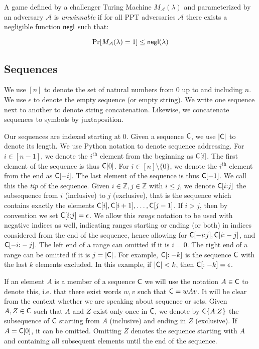 \begin{definition}[Unwinnability]
  A game defined by a challenger Turing Machine $M_\mathcal{A}(\lambda)$ and parameterized by an adversary $\mathcal{A}$ is \emph{unwinnable} if for all PPT adversaries $\mathcal{A}$ there exists a negligible function $\mathsf{negl}$ such that:

  \[
    \Pr[M_\mathcal{A}(\lambda) = 1] \leq \mathsf{negl}(\lambda)
  \]
\end{definition}

\subsection{Sequences}
We use $[n]$ to denote the set of natural numbers from $0$ up to and including
$n$. We use $\epsilon$ to denote the empty sequence (or empty string). We write
one sequence next to another to denote string concatenation. Likewise, we
concatenate sequences to symbols by juxtaposition.

Our sequences are indexed starting at $0$. Given a sequence $\mathsf{C}$, we use
$|\mathsf{C}|$ to denote its length. We use Python notation to denote sequence
addressing. For $i \in [n - 1]$, we denote the $i^\text{th}$ element from the
beginning as $\mathsf{C}[i]$. The first element of the sequence is thus $\mathsf{C}[0]$.
For $i \in [n] \setminus \{0\}$, we denote the $i^\text{th}$ element from the
end as $\mathsf{C}[-i]$. The last element of the sequence is thus $\mathsf{C}[-1]$. We
call this the \emph{tip} of the sequence. Given $i \in \mathbb{Z},
j \in \mathbb{Z}$ with $i \leq j$, we denote $\mathsf{C}[i{:}j]$ the subsequence from
$i$ (inclusive) to $j$ (exclusive), that is the sequence which contains exactly
the elements $\mathsf{C}[i], \mathsf{C}[i + 1], \dots, \mathsf{C}[j - 1]$. If $i > j$, then
by convention we set $\mathsf{C}[i{:}j] = \epsilon$. We allow this \emph{range}
notation to be used with negative indices as well, indicating ranges starting or
ending (or both) in indices considered from the end of the sequence, hence
allowing for $\mathsf{C}[-i{:}j], \mathsf{C}[i{:}-j]$, and $\mathsf{C}[-i{:}-j]$. The left end of
a range can omitted if it is $i = 0$. The right end of a range can be omitted if
it is $j = |\mathsf{C}|$. For example, $\mathsf{C}[:-k]$ is the sequence $\mathsf{C}$ with
the last $k$ elements excluded. In this example, if $|\mathsf{C}| < k$, then
$\mathsf{C}[:-k] = \epsilon$.

If an element $A$ is a member of a sequence $\mathsf{C}$ we will use the notation $A
\in \mathsf{C}$ to denote this, i.e. that there exist words $w, v$ such that $\mathsf{C}
= wAv$. It will be clear from the context whether we are speaking about sequence
or sets. Given $A, Z \in \mathsf{C}$ such that $A$ and $Z$ exist only once in
$\mathsf{C}$, we denote by $\mathsf{C}\{A{:}Z\}$ the subsequence of $\mathsf{C}$ starting from
$A$ (inclusive) and ending in $Z$ (exclusive). If $A = \mathsf{C}[0]$, it can be
omitted. Omitting $Z$ denotes the sequence starting with $A$ and containing all
subsequent elements until the end of the sequence.

